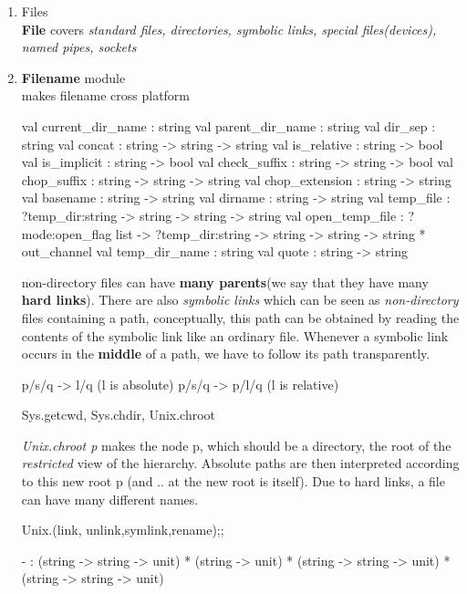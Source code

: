 \begin{enumerate}
\item Files \\
  \textbf{File} covers \textit{standard files, directories, symbolic
    links, special files(devices), named pipes, sockets}
\item \textbf{Filename}  module \\
  makes filename cross platform
  \begin{bluetext}
    val current_dir_name : string
    val parent_dir_name : string
    val dir_sep : string
    val concat : string -> string -> string
    val is_relative : string -> bool
    val is_implicit : string -> bool
    val check_suffix : string -> string -> bool
    val chop_suffix : string -> string -> string
    val chop_extension : string -> string
    val basename : string -> string
    val dirname : string -> string
    val temp_file : ?temp_dir:string -> string -> string -> string
    val open_temp_file :
      ?mode:open_flag list ->
      ?temp_dir:string -> string -> string -> string * out_channel
    val temp_dir_name : string
    val quote : string -> string
  \end{bluetext}

  non-directory files can have \textbf{many parents}(we say that they have many
  \textbf{hard links}). There are also \textit{symbolic links} which
  can be seen as \textit{non-directory} files containing a path, conceptually,
  this path can be obtained by reading the contents of the symbolic
  link like an ordinary file. Whenever a symbolic link occurs in the
  \textbf{middle} of  a path, we have to follow its path
  transparently.
  \begin{bluetext}
    p/s/q -> l/q (l is absolute)
    p/s/q -> p/l/q (l is relative)
  \end{bluetext}
  \begin{bluetext}
    Sys.getcwd, Sys.chdir, Unix.chroot
  \end{bluetext}
  \textit{Unix.chroot p} makes the node p, which should be a
  directory, the root of the \textit{restricted} view of the
  hierarchy. Absolute paths are then interpreted according to this new
  root p (and .. at the new root is itself).
  Due to hard links, a file can have many different names.

\begin{redcode}
Unix.(link, unlink,symlink,rename);;
\end{redcode}
\begin{bluecode}
- : (string -> string -> unit) * (string -> unit) *
    (string -> string -> unit) * (string -> string -> unit)    
  \end{bluecode}
  

\end{enumerate}
